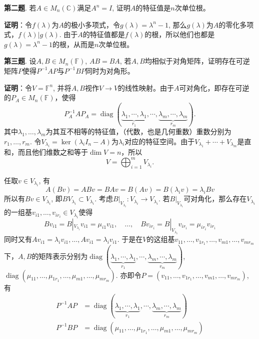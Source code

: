 \newpageorvspace


{\bf 第二题}. 若$A \in M_n (\mathbb{C})$满足$A^n = I$, 证明$A$的特征值是$n$次单位根。

{\bf 证明}：令$f(\lambda)$为$A$的极小多项式，令$g(\lambda) = \lambda^n - 1$, 那么$g(\lambda)$为$A$的零化多项式，$f(\lambda) | g(\lambda)$. 由于$A$的特征值都是$f(\lambda)$的根，所以他们也都是$g(\lambda) = \lambda^n - 1$的根，从而是$n$次单位根。


\newpageorvspace


{\bf 第三题}. 设$A, B \in M_n(\mathbb{F})$, $AB=BA$, 若$A,B$均相似于对角矩阵，证明存在可逆矩阵$P$使得$P^{-1}AP$与$P^{-1}BP$同时为对角形。

{\bf 证明}：令$V = \mathbb{F}^n$, 并将$A,B$视作$V \to V$的线性映射。由于$A$可对角化，即存在可逆的$P_A \in M_n(\mathbb{F})$，使得
$$P_A^{-1}AP_A = \operatorname{diag} (\underbrace{\lambda_1,\cdots,\lambda_1}_{r_1}, \cdots, \underbrace{\lambda_m,\cdots,\lambda_m}_{r_m}).$$
其中$\lambda_1, \ldots, \lambda_m$为其互不相等的特征值，（代数，也是几何重数）重数分别为$r_1,\ldots,r_m$. 令$V_{\lambda_i} = \ker (\lambda_i I_n - A)$为$\lambda_i$对应的特征空间。由于$V_{\lambda_1} + \cdots + V_{\lambda_m}$是直和，而且他们维数之和等于$\dim V = n$，所以
$$V = \bigoplus_{i=1}^m V_{\lambda_i}.$$

任取$v \in V_{\lambda_i}$, 有
$$A(Bv) = ABv = BAv = B(Av) = B(\lambda_i v) = \lambda_i Bv$$
所以有$Bv \in V_{\lambda_i}$, 即$BV_{\lambda_i} \subset V_{\lambda_i}$. 考虑$B|_{V_{\lambda_i}}: V_{\lambda_i} \to V_{\lambda_i}$. 若$B|_{V_{\lambda_i}}$可对角化，那么存在$V_{\lambda_i}$的一组基$v_{i1},\ldots,v_{ir_i} \in V_{\lambda_i}$使得
$$B v_{i1} = B|_{V_{\lambda_i}} v_{i1} = \mu_{i1} v_{i1}, \quad \ldots, \quad  B v_{ir_i} = B|_{V_{\lambda_i}} v_{ir_i} = \mu_{ir_i} v_{ir_i}$$
同时又有$A v_{i1} = \lambda_i v_{i1}, \ldots, A v_{i1} = \lambda_i v_{i1}$. 于是在$V$的这组基$v_{11}, \ldots, v_{1r_1}, \ldots, v_{m1}, \ldots, v_{mr_m}$下，$A,B$的矩阵表示分别为$\operatorname{diag} (\underbrace{\lambda_1,\cdots,\lambda_1}_{r_1}, \cdots, \underbrace{\lambda_m,\cdots,\lambda_m}_{r_m})$, $\operatorname{diag} (\mu_{11}, \ldots, \mu_{1r_1}, \ldots, \mu_{m1}, \ldots, \mu_{mr_m})$. 亦即令$P = (v_{11}, \ldots, v_{1r_1}, \ldots, v_{m1}, \ldots, v_{mr_m})$, 有
\begin{align*}
P^{-1}AP & = \operatorname{diag} (\underbrace{\lambda_1,\cdots,\lambda_1}_{r_1}, \cdots, \underbrace{\lambda_m,\cdots,\lambda_m}_{r_m}) \\
P^{-1}BP & = \operatorname{diag} (\mu_{11}, \ldots, \mu_{1r_1}, \ldots, \mu_{m1}, \ldots, \mu_{mr_m})
\end{align*}

